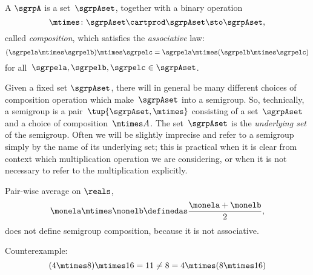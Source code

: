 

\section{}\label{sec:semigroups}


\begin{ctdefinition}[Semigroup]
  \label{def:semigroup}
  A \emph{} $\sgrpA$ is a set~$\sgrpAset$, together with a binary operation~
  \begin{equation}
    \mtimes  \colon \sgrpAset \cartprod \sgrpAset \sto \sgrpAset,
  \end{equation}
  called \emph{composition}, which satisfies the \emph{associative} law:
  \begin{equation}
    \label{eq:semigroup-associative}
    (\sgrpela \mtimes   \sgrpelb)\mtimes   \sgrpelc
    = \sgrpela \mtimes   (\sgrpelb \mtimes  \sgrpelc)
  \end{equation}
  for all~$\sgrpela , \sgrpelb, \sgrpelc \in \sgrpAset$.
\end{ctdefinition}


\begin{remark}
  Given a fixed set $\sgrpAset$, there will in general be many different choices of composition operation which make~$\sgrpAset$ into a semigroup.
  So, technically, a semigroup is a pair~$\tup{\sgrpAset, \mtimes}$ consisting of a set~$\sgrpAset$ and a choice of composition~$\mtimes A$.
  The set~$\sgrpAset$ is the \emph{underlying set} of the semigroup.
  Often we will be slightly imprecise and refer to a semigroup simply by the name of its underlying set; this is practical when it is clear from context which multiplication operation we are considering, or when it is not necessary to refer to the multiplication explicitly.
\end{remark}



\begin{example}
Pair-wise average on $\reals$,
\begin{equation}
    \label{eq:pairwise}
    \monela \mtimes \monelb \definedas  \frac{\monela + \monelb}{2},
\end{equation}
does not define semigroup composition, because it is not associative.

Counterexample:
\begin{equation}\label{eq:pairwise-counterexample}
(4 \mtimes 8) \mtimes 16 = 11 \neq  8 = 4 \mtimes (8 \mtimes 16)
\end{equation}
\end{example}



